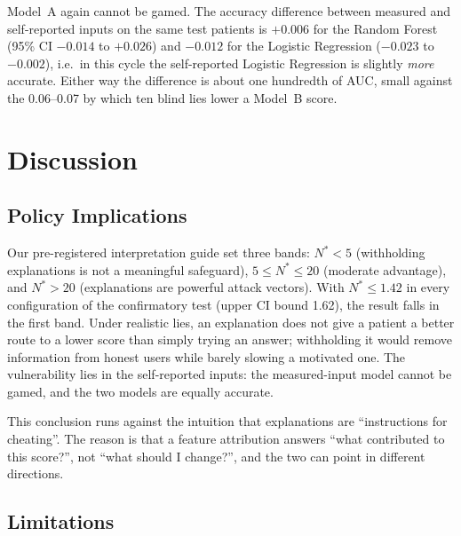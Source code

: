 \documentclass[sigconf,nonacm]{acmart}
\begin{document}
Model~A again cannot be gamed.  The accuracy difference between
measured and self-reported inputs on the same test patients is $+0.006$
for the Random Forest (95\% CI $-0.014$ to $+0.026$) and $-0.012$ for
the Logistic Regression ($-0.023$ to $-0.002$), i.e.\ in this cycle the
self-reported Logistic Regression is slightly \emph{more} accurate.
Either way the difference is about one hundredth of AUC, small against
the 0.06--0.07 by which ten blind lies lower a Model~B score.

\section{Discussion}

\subsection{Policy Implications}

Our pre-registered interpretation guide set three bands: $N^*<5$
(withholding explanations is not a meaningful safeguard),
$5 \le N^* \le 20$ (moderate advantage), and $N^*>20$ (explanations are
powerful attack vectors).  With $N^* \le 1.42$ in every configuration
of the confirmatory test (upper CI bound 1.62), the result falls in the
first band.  Under realistic lies, an explanation
does not give a patient a better route to a lower score than simply
trying an answer; withholding it would remove information from honest
users while barely slowing a motivated one.  The vulnerability lies
in the self-reported inputs: the measured-input model cannot be gamed,
and the two models are equally accurate.

This conclusion runs against the intuition that explanations are
``instructions for cheating''.  The reason is that a feature
attribution answers ``what contributed to this score?'', not ``what
should I change?'', and the two can point in different directions.

\subsection{Limitations}
\end{document}
